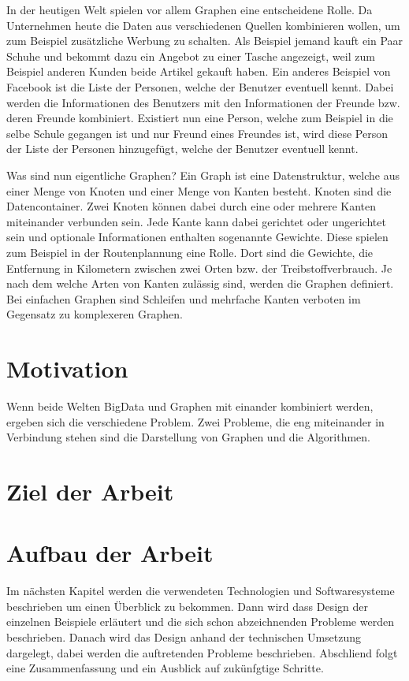 In der heutigen Welt spielen vor allem Graphen eine entscheidene Rolle. Da 
Unternehmen heute die Daten aus verschiedenen Quellen kombinieren wollen, um zum
Beispiel zusätzliche Werbung zu schalten. Als Beispiel jemand kauft ein Paar
Schuhe und bekommt dazu ein Angebot zu einer Tasche angezeigt, weil zum
Beispiel anderen Kunden beide Artikel gekauft haben. Ein anderes Beispiel von
Facebook ist die Liste der Personen, welche der Benutzer eventuell kennt.
Dabei werden die Informationen des Benutzers mit den Informationen der Freunde
bzw. deren Freunde kombiniert. Existiert nun eine Person, welche zum Beispiel
in die selbe Schule gegangen ist und nur Freund eines Freundes ist, wird diese
Person der Liste der Personen hinzugefügt, welche der Benutzer eventuell kennt.

Was sind nun eigentliche Graphen? Ein Graph ist eine Datenstruktur, welche aus
einer Menge von Knoten und einer Menge von Kanten besteht. Knoten sind die
Datencontainer. Zwei Knoten können dabei durch eine oder mehrere Kanten miteinander
verbunden sein. Jede Kante kann dabei gerichtet oder ungerichtet sein und
optionale Informationen enthalten sogenannte Gewichte. Diese spielen zum Beispiel
in der Routenplannung eine Rolle. Dort sind die Gewichte, die Entfernung in
Kilometern zwischen zwei Orten bzw. der Treibstoffverbrauch. Je nach dem welche
Arten von Kanten zulässig sind, werden die Graphen definiert. Bei einfachen
Graphen sind Schleifen und mehrfache Kanten verboten im Gegensatz zu komplexeren
Graphen.

\section{Motivation}
Wenn beide Welten \gls{BigData} und Graphen mit einander kombiniert werden, ergeben
sich die verschiedene Problem. Zwei Probleme, die eng miteinander in Verbindung
stehen sind die Darstellung von Graphen und die Algorithmen.


\section{Ziel der Arbeit}

\section{Aufbau der Arbeit}
Im nächsten Kapitel werden die verwendeten Technologien und Softwaresysteme
beschrieben um einen Überblick zu bekommen. Dann wird dass Design der einzelnen
Beispiele erläutert und die sich schon abzeichnenden Probleme werden beschrieben.
Danach wird das Design anhand der technischen Umsetzung dargelegt, dabei werden
die auftretenden Probleme beschrieben. Abschliend folgt eine Zusammenfassung und
ein Ausblick auf zukünfgtige Schritte.
